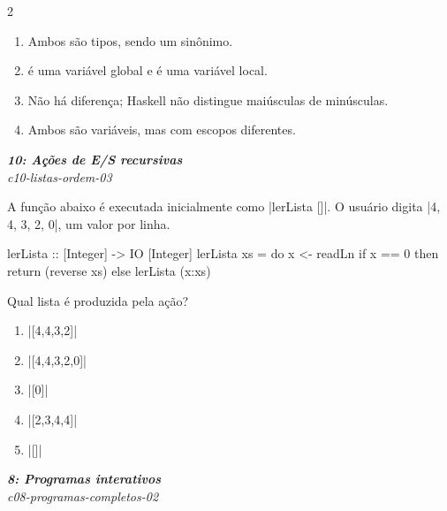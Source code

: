 \documentclass[a4paper,10pt,brazil]{article}
\begin{document}
\begin{multicols}{2}
\begin{enumerate}
  \item Ambos são tipos, sendo  um sinônimo.

  \item {} é uma variável global e  é uma variável local.

  \item Não há diferença; Haskell não distingue maiúsculas de minúsculas.

  \item Ambos são variáveis, mas com escopos diferentes.


\end{enumerate}

\begin{flushright}
  \footnotesize
  \textit{\textbf{10: Ações de E/S recursivas}}\\
  \textit{c10-listas-ordem-03}\\

\end{flushright}
A função abaixo é executada inicialmente como \haskellinline|lerLista []|. O usuário digita \haskellinline|4, 4, 3, 2, 0|, um valor por linha.

\begin{haskellcode}
lerLista :: [Integer] -> IO [Integer]
lerLista xs = do
  x <- readLn
  if x == 0
    then return (reverse xs)
    else lerLista (x:xs)
\end{haskellcode}

Qual lista é produzida pela ação?

\begin{enumerate}
  \item \haskellinline|[4,4,3,2]|

  \item \haskellinline|[4,4,3,2,0]|

  \item \haskellinline|[0]|

  \item \haskellinline|[2,3,4,4]|

  \item \haskellinline|[]|


\end{enumerate}

\begin{flushright}
  \footnotesize
  \textit{\textbf{8: Programas interativos}}\\
  \textit{c08-programas-completos-02}\\


\end{flushright}
\end{multicols}
\end{document}
